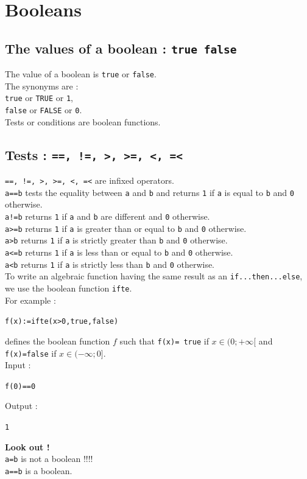 \documentclass[a4paper,11pt]{book}
\begin{document}
\section{Booleans}
\label{sec:boolean}
\subsection{The values of a boolean : {\tt true false}}
The value of a boolean is {\tt true} or {\tt false}.\\
The synonyms are :\\
{\tt true} or {\tt TRUE} or {\tt 1},\\
{\tt false} or {\tt FALSE} or {\tt 0}.\\
Tests or conditions are boolean functions.

\subsection{Tests : {\tt ==, !=, >, >=, <, =<}}\index{==}\index{>}\index{<}\index{>=}\index{<=}
{\tt ==, !=, >, >=, <, =<} are infixed operators.\\
{\tt a==b} tests the equality between {\tt a} and {\tt b} and returns {\tt 1} 
if {\tt a} is equal to {\tt b} and {\tt 0} otherwise.\\ 
{\tt a!=b} returns {\tt 1} if {\tt a} and {\tt b} are different and {\tt 0} 
otherwise.\\
 {\tt a>=b} returns {\tt 1} if {\tt a} is greater than or equal to {\tt b} 
and {\tt 0} otherwise.\\ 
{\tt a>b} returns {\tt 1} if {\tt a} is strictly greater than {\tt b}
and {\tt 0} otherwise.\\ 
{\tt a<=b} returns {\tt 1} if {\tt a} is less than or equal to {\tt b} and 
{\tt 0} otherwise.\\
{\tt a<b} returns {\tt 1} if {\tt a} is strictly less than {\tt b} 
and {\tt 0} otherwise.\\ 
To write an algebraic function having the same result as an 
{\tt if...then...else}, we use the boolean function {\tt ifte}.\\
For example :  
\begin{center}{\tt f(x):=ifte(x>0,true,false)}\end{center}
defines the boolean function $f$ such that {\tt f(x)= true} if 
$x \in (0;+\infty[$ and {\tt f(x)=false} if $x \in (-\infty;0]$.\\
Input :
\begin{center}{\tt f(0)==0}\end{center}
Output :
\begin{center}{\tt 1}\end{center}
{\bf Look out !}\\
{\tt a=b}  is not a boolean !!!!\\
{\tt a==b} is a boolean.\\
\end{document}
